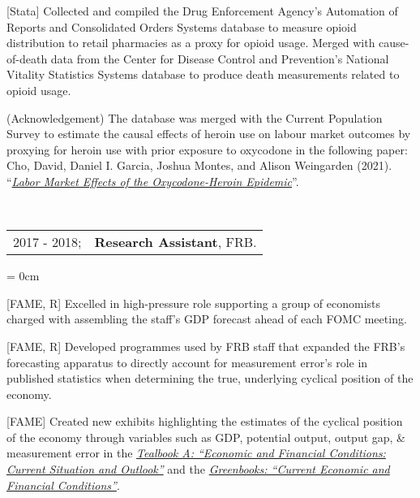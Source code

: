 \documentclass[a4paper, 10pt]{article}
\begin{document}
\begin{compactitem}
    \item {[Stata]} Collected and compiled the Drug Enforcement Agency's Automation of Reports and Consolidated Orders Systems database to measure opioid distribution to retail pharmacies as a proxy for opioid usage. Merged with cause-of-death data from the Center for Disease Control and Prevention's National Vitality Statistics Systems database to produce death measurements related to opioid usage.
    \begin{compactitem}
      \item {(Acknowledgement)} The database was merged with the Current Population Survey to estimate the causal effects of heroin use on labour market outcomes by proxying for heroin use with prior exposure to oxycodone in the following paper: Cho, David, Daniel I. Garcia, Joshua Montes, and Alison Weingarden (2021). ``\href{https://doi.org/10.17016/FEDS.2021.025}{\textit{Labor Market Effects of the Oxycodone-Heroin Epidemic}}''.
    \end{compactitem}
  \end{compactitem}
  \vspace*{1.25em}
      
  ~\begin{tabular}{ll}
    2017 - 2018; & \textbf{Research Assistant}, FRB.
  \end{tabular}
  \begin{compactitem}\parskip = 0cm
    \item {[FAME, R]} Excelled in high-pressure role supporting a group of economists charged with assembling the staff's GDP forecast ahead of each FOMC meeting.
    \item {[FAME, R]} Developed programmes used by FRB staff that expanded the FRB's forecasting apparatus to directly account for measurement error's role in published statistics when determining the true, underlying cyclical position of the economy.
    \item {[FAME]} Created new exhibits highlighting the estimates of the cyclical position of the economy through variables such as GDP, potential output, output gap, \& measurement error in the \href{https://www.federalreserve.gov/monetarypolicy/fomc_historical.htm#tealbooks}{\textit{Tealbook A: ``Economic and Financial Conditions: Current Situation and Outlook''}} and the \href{https://www.federalreserve.gov/monetarypolicy/fomc_historical.htm#greenbooks}{\textit{Greenbooks: ``Current Economic and Financial Conditions''}}.
  \end{compactitem}
  \vspace*{0.25em}
      
\end{document}
